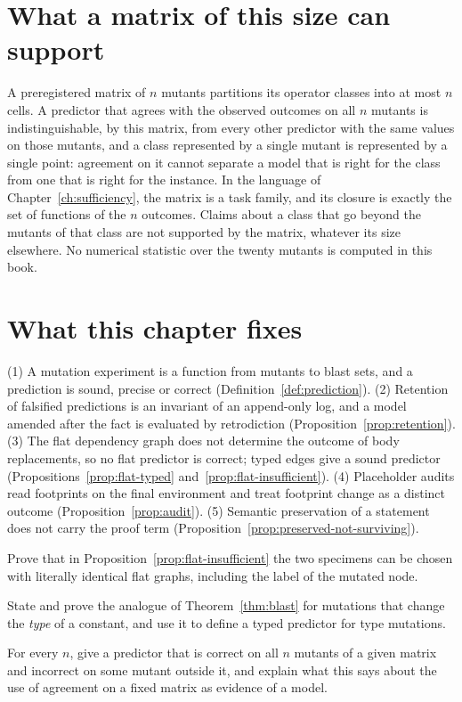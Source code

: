 \section{What a matrix of this size can support}

A preregistered matrix of $n$ mutants partitions its operator classes into at most $n$ cells. A predictor that agrees with the observed outcomes on all $n$ mutants is indistinguishable, by this matrix, from every other predictor with the same values on those mutants, and a class represented by a single mutant is represented by a single point: agreement on it cannot separate a model that is right for the class from one that is right for the instance. In the language of Chapter~\ref{ch:sufficiency}, the matrix is a task family, and its closure is exactly the set of functions of the $n$ outcomes. Claims about a class that go beyond the mutants of that class are not supported by the matrix, whatever its size elsewhere. No numerical statistic over the twenty mutants is computed in this book.

\section{What this chapter fixes}

\begin{principal}
(1) A mutation experiment is a function from mutants to blast sets, and a prediction is sound, precise or correct (Definition~\ref{def:prediction}). (2) Retention of falsified predictions is an invariant of an append-only log, and a model amended after the fact is evaluated by retrodiction (Proposition~\ref{prop:retention}). (3) The flat dependency graph does not determine the outcome of body replacements, so no flat predictor is correct; typed edges give a sound predictor (Propositions~\ref{prop:flat-typed} and~\ref{prop:flat-insufficient}). (4) Placeholder audits read footprints on the final environment and treat footprint change as a distinct outcome (Proposition~\ref{prop:audit}). (5) Semantic preservation of a statement does not carry the proof term (Proposition~\ref{prop:preserved-not-surviving}).
\end{principal}

\begin{exercise}
Prove that in Proposition~\ref{prop:flat-insufficient} the two specimens can be chosen with literally identical flat graphs, including the label of the mutated node.
\end{exercise}

\begin{exercise}
State and prove the analogue of Theorem~\ref{thm:blast} for mutations that change the \emph{type} of a constant, and use it to define a typed predictor for type mutations.
\end{exercise}

\begin{exercise}
For every $n$, give a predictor that is correct on all $n$ mutants of a given matrix and incorrect on some mutant outside it, and explain what this says about the use of agreement on a fixed matrix as evidence of a model.
\end{exercise}
